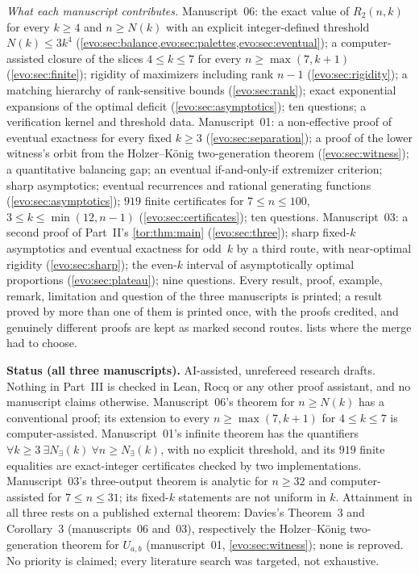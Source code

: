 \documentclass[11pt,a4paper]{article}
\numberwithin{equation}{section}
\theoremstyle{definition}
\theoremstyle{remark}
\begin{document}
\emph{What each manuscript contributes.} Manuscript~06: the exact value of
$R_2(n,k)$ for every $k\ge4$ and $n\ge N(k)$ with an explicit integer-defined
threshold $N(k)\le3k^4$ (\cref{evo:sec:balance,evo:sec:palettes,evo:sec:eventual});
a computer-assisted closure of the slices $4\le k\le7$ for every
$n\ge\max(7,k+1)$ (\cref{evo:sec:finite}); rigidity of maximizers including
rank $n-1$ (\cref{evo:sec:rigidity}); a matching hierarchy of rank-sensitive
bounds (\cref{evo:sec:rank}); exact exponential expansions of the optimal
deficit (\cref{evo:sec:asymptotics}); ten questions; a verification kernel and
threshold data. Manuscript~01: a non-effective proof of eventual exactness
for every fixed $k\ge3$ (\cref{evo:sec:separation}); a proof of the lower
witness's orbit from the Holzer--K\"onig two-generation theorem
(\cref{evo:sec:witness}); a quantitative balancing gap; an eventual
if-and-only-if extremizer criterion; sharp asymptotics; eventual recurrences
and rational generating functions (\cref{evo:sec:asymptotics}); $919$ finite
certificates for $7\le n\le100$, $3\le k\le\min(12,n-1)$
(\cref{evo:sec:certificates}); ten questions. Manuscript~03: a second proof of
Part~II's \cref{tor:thm:main} (\cref{evo:sec:three}); sharp fixed-$k$
asymptotics and eventual exactness for odd~$k$ by a third route, with
near-optimal rigidity (\cref{evo:sec:sharp}); the even-$k$ interval of
asymptotically optimal proportions (\cref{evo:sec:plateau}); nine questions.
Every result, proof, example, remark, limitation and question of the three
manuscripts is printed; a result proved by more than one of them is printed
once, with the proofs credited, and genuinely different proofs are kept as
marked second routes.  lists where the merge had to
choose.

\begin{resultbox}
\textbf{Status (all three manuscripts).} AI-assisted, unrefereed research
drafts. Nothing in Part~III is checked in Lean, Rocq or any other proof
assistant, and no manuscript claims otherwise. Manuscript~06's theorem for
$n\ge N(k)$ has a conventional proof; its extension to every
$n\ge\max(7,k+1)$ for $4\le k\le7$ is computer-assisted. Manuscript~01's
infinite theorem has the quantifiers
$\forall k\ge3\ \exists N_\exists(k)\ \forall n\ge N_\exists(k)$, with no
explicit threshold, and its $919$ finite equalities are exact-integer
certificates checked by two implementations. Manuscript~03's three-output
theorem is analytic for $n\ge32$ and computer-assisted for $7\le n\le31$; its
fixed-$k$ statements are not uniform in $k$. Attainment in all three rests on
a published external theorem: Davies's Theorem~3 and Corollary~3 (manuscripts~06
and~03), respectively the Holzer--K\"onig two-generation theorem for $U_{a,b}$
(manuscript~01, \cref{evo:sec:witness}); none is reproved. No priority is
claimed; every literature search was targeted, not exhaustive.
\end{resultbox}
\end{document}
